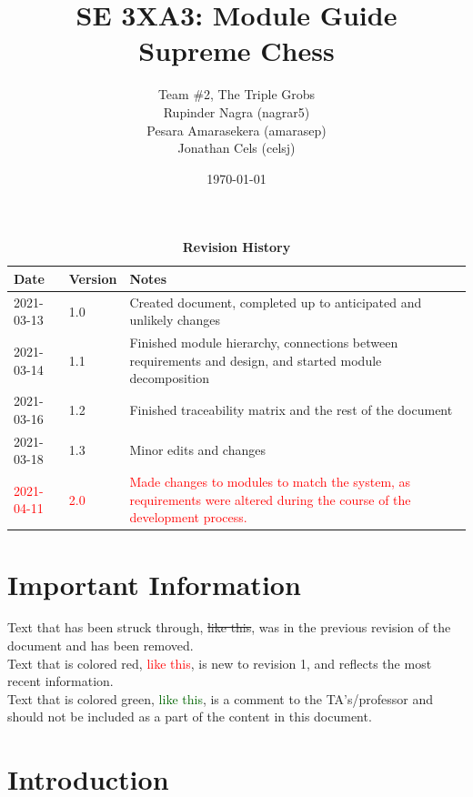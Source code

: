 \documentclass[12pt, titlepage]{article}
\title{SE 3XA3: Module Guide\\Supreme Chess}
\author{Team \#2, The Triple Grobs
		\\ Rupinder Nagra (nagrar5)
		\\ Pesara Amarasekera (amarasep)
		\\ Jonathan Cels (celsj)
}
\date{\today}
\begin{document}
\maketitle

\tableofcontents
\listoftables
\listoffigures

\newpage
\begin{table}[bp]
    \caption{\bf Revision History}
    \begin{tabularx}{\textwidth}{p{3cm}p{2cm}X}
    \toprule {\bf Date} & {\bf Version} & {\bf Notes}\\
    \midrule
    2021-03-13 & 1.0 & Created document, completed up to anticipated and unlikely changes\\
    2021-03-14 & 1.1 & Finished module hierarchy, connections between requirements and design, and started module decomposition\\
    2021-03-16 & 1.2 & Finished traceability matrix and the rest of the document\\
    2021-03-18 & 1.3 & Minor edits and changes\\
    \textcolor{red}{2021-04-11} & \textcolor{red}{2.0} & \textcolor{red}{Made changes to modules to match the system, as requirements were altered during the course of the development process.}\\
    \bottomrule
    \end{tabularx}
\end{table}


\section*{Important Information}
    Text that has been struck through, \sout{like this}, was in the previous revision of the document and has been removed. \\
    
    Text that is colored red, \textcolor{red}{like this}, is new to revision 1, and reflects the most recent information. \\
    
    Text that is colored green, \textcolor{darkgreen}{like this}, is a comment to the TA's/professor and should not be included as a part of the content in this document. \\

\newpage
     
\section{Introduction}
\end{document}
